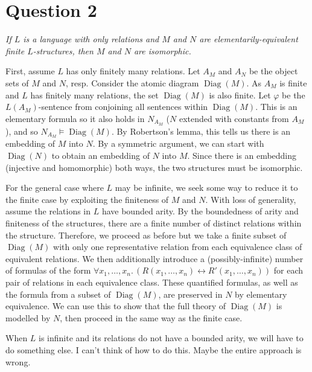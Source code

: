 \documentclass[a4paper]{article}
\DeclareMathOperator{\Diag}{Diag}
\begin{document}
\section*{Question 2}
\begin{center}
  \textit{If $L$ is a language with only relations and $M$ and $N$ are
  elementarily-equivalent finite $L$-structures, then $M$ and $N$ are isomorphic.}
\end{center}
First, assume $L$ has only finitely many relations.
Let $A_M$ and $A_N$ be the object sets of $M$ and $N$, resp.
Consider the atomic diagram $\Diag(M)$.
As $A_M$ is finite and $L$ has finitely many relations,
the set $\Diag(M)$ is also finite.
Let $\varphi$ be the $L(A_M)$-sentence from conjoining all
sentences within $\Diag(M)$.
This is an elementary formula so it also holds in $N_{A_M}$
($N$ extended with constants from $A_M$), and so
$N_{A_M} \models \Diag(M)$.
By Robertson's lemma, this tells us there is an embedding of
$M$ into $N$.
By a symmetric argument, we can start with $\Diag(N)$ to obtain
an embedding of $N$ into $M$.
Since there is an embedding (injective and homomorphic) both ways, the two structures must be isomorphic.

For the general case where $L$ may be infinite, we seek some way to reduce
it to the finite case by exploiting the finiteness of $M$ and $N$.
With loss of generality, assume the relations in $L$ have bounded arity.
By the boundedness of arity and finiteness of the structures,
there are a finite number of distinct relations within the structure.
Therefore, we proceed as before but we take a finite subset of $\Diag(M)$
with only one representative relation from each equivalence class of equivalent
relations.
We then additionally introduce a (possibly-infinite) number of formulas
of the form $\forall x_1,\ldots,x_n.\, (R(x_1,\ldots,x_n) \longleftrightarrow R'(x_1,\ldots,x_n))$
for each pair of relations in each equivalence class.
These quantified formulas, as well as the formula from a subset of $\Diag(M)$,
are preserved in $N$ by elementary equivalence.
We can use this to show that the full theory of $\Diag(M)$ is modelled by $N$,
then proceed in the same way as the finite case.

When $L$ is infinite and its relations do not have a bounded arity,
we will have to do something else.
I can't think of how to do this.
Maybe the entire approach is wrong.
\end{document}
